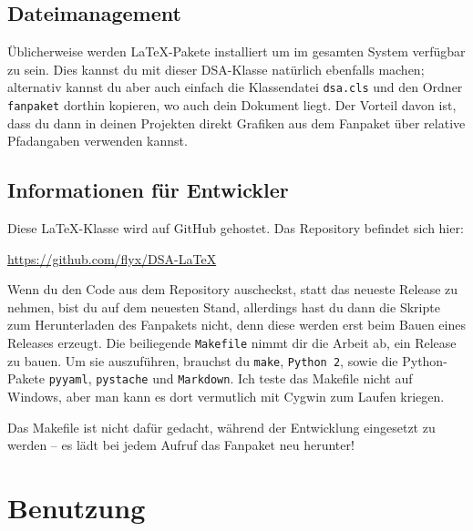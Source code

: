 \documentclass{dsa}
\begin{document}
  \subsection*{Dateimanagement}
  
  Üblicherweise werden \LaTeX-Pakete installiert um im gesamten System
  verfügbar zu sein. Dies kannst du mit dieser DSA-Klasse natürlich ebenfalls
  machen; alternativ kannst du aber auch einfach die Klassendatei \texttt{dsa.cls}
  und den Ordner \texttt{fanpaket} dorthin kopieren, wo auch dein Dokument
  liegt. Der Vorteil davon ist, dass du dann in deinen Projekten direkt Grafiken
  aus dem Fanpaket über relative Pfadangaben verwenden kannst.
  
  \begin{dsaBoxPortrait}
    \subsection*{\normalsize Informationen für Entwickler}
    
    Diese LaTeX-Klasse wird auf GitHub gehostet. Das Repository befindet sich
    hier:
    
    \url{https://github.com/flyx/DSA-LaTeX}
    
    Wenn du den Code aus dem Repository aus\-checkst, statt das neueste
    Release zu nehmen, bist du auf dem neuesten Stand, allerdings hast du
    dann die Skripte zum Herunterladen des Fanpakets nicht, denn diese werden
    erst beim Bauen eines Releases erzeugt. Die beiliegende \texttt{Makefile}
    nimmt dir die Arbeit ab, ein Release zu bauen. Um sie auszuführen, brauchst
    du \texttt{make}, \texttt{Python 2}, sowie die Python-Pakete
    \texttt{pyyaml}, \texttt{pystache} und \texttt{Markdown}. Ich teste das
    Makefile nicht auf Windows, aber man kann es dort vermutlich mit
    Cygwin zum Laufen kriegen. 
    
    Das Makefile ist nicht dafür gedacht, während der Entwicklung eingesetzt
    zu werden – es lädt bei jedem Aufruf das Fanpaket neu herunter!
    
  \end{dsaBoxPortrait}
  
  
  \onecolumn
  
  \section*{Benutzung}
  
\end{document}
